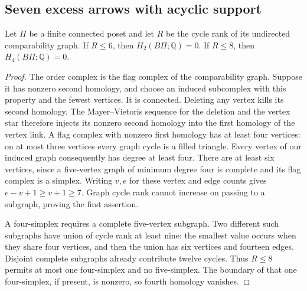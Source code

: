 \subsection{Seven excess arrows with acyclic support}

\begin{lemma}
\label{C:flag-second-cycle-budget}
Let $\Pi$ be a finite connected poset and let $R$ be the cycle
rank of its undirected comparability graph.  If $R\leq6$, then
$H_2(B\Pi;\mathbb Q)=0$.  If $R\leq8$, then
$H_4(B\Pi;\mathbb Q)=0$.
\end{lemma}
\begin{proof}
The order complex is the flag complex of the comparability graph.
Suppose it has nonzero second homology, and choose an induced
subcomplex with this property and the fewest vertices.  It is
connected.  Deleting any vertex kills its second homology.
The Mayer--Vietoris sequence for the deletion and the vertex
star therefore injects its nonzero second homology into the
first homology of the vertex link.  A flag complex with nonzero
first homology has at least four vertices: on at most three
vertices every graph cycle is a filled triangle.  Every vertex
of our induced graph consequently has degree at least four.
There are at least six vertices, since a five-vertex graph of
minimum degree four is complete and its flag complex is a simplex.
Writing $v,e$ for these vertex and edge counts gives
$e-v+1\geq v+1\geq7$.  Graph cycle rank cannot increase on
passing to a subgraph, proving the first assertion.

A four-simplex requires a complete five-vertex subgraph.
Two different such subgraphs have union of cycle rank at least
nine: the smallest value occurs when they share four vertices,
and then the union has six vertices and fourteen edges.
Disjoint complete subgraphs already contribute twelve cycles.
Thus $R\leq8$ permits at most one four-simplex and no
five-simplex.  The boundary of that one four-simplex, if present,
is nonzero, so fourth homology vanishes.
\end{proof}

